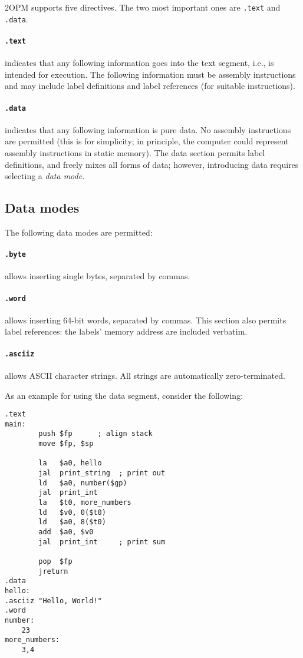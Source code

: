 \documentclass{article}
\begin{document}
2OPM supports five directives.  The two most important ones are \texttt{.text} and \texttt{.data}.

\paragraph{\texttt{.text}} indicates that any following information goes into the text segment, 
i.e., is intended for execution.  The following information must be assembly instructions
and may include label definitions and label references (for suitable instructions).

\paragraph{\texttt{.data}} indicates  that any following information is pure data.  No 
assembly instructions are permitted (this is for simplicity; in principle, the
computer could represent assembly instructions in static memory).  The data section 
permits label definitions, and
freely
mixes all forms of data; however, introducing data requires selecting a \emph{data mode}.

\subsection{Data modes}

The following data modes are permitted:

\paragraph{\texttt{.byte}} allows inserting single bytes, separated by commas.

\paragraph{\texttt{.word}} allows inserting 64-bit words, separated by commas.  This section
also permits label references: the labels' memory address are included verbatim.

\paragraph{\texttt{.asciiz}} allows ASCII character strings.  All strings are automatically
zero-terminated.

As an example for using the data segment, consider the following:

\begin{lstlisting}
.text
main:
        push $fp      ; align stack
        move $fp, $sp

        la   $a0, hello
        jal  print_string  ; print out
        ld   $a0, number($gp)
        jal  print_int
        la   $t0, more_numbers
        ld   $v0, 0($t0)
        ld   $a0, 8($t0)
        add  $a0, $v0
        jal  print_int     ; print sum

        pop  $fp
        jreturn
.data
hello:
.asciiz "Hello, World!"
.word
number:
	23
more_numbers:
	3,4
\end{lstlisting}
\end{document}
